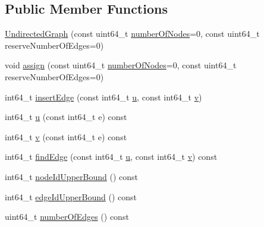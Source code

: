 \subsection*{Public Member Functions}
\begin{DoxyCompactItemize}
\item 
\hyperlink{classnifty_1_1graph_1_1UndirectedGraph_a3c2087810feadcef80e0a1a1ca288b43}{Undirected\+Graph} (const uint64\+\_\+t \hyperlink{classnifty_1_1graph_1_1UndirectedGraph_af3450885d48968733f3754544a20c012}{number\+Of\+Nodes}=0, const uint64\+\_\+t reserve\+Number\+Of\+Edges=0)
\item 
void \hyperlink{classnifty_1_1graph_1_1UndirectedGraph_a0c4b2840735519b961431c64400c2dc2}{assign} (const uint64\+\_\+t \hyperlink{classnifty_1_1graph_1_1UndirectedGraph_af3450885d48968733f3754544a20c012}{number\+Of\+Nodes}=0, const uint64\+\_\+t reserve\+Number\+Of\+Edges=0)
\item 
int64\+\_\+t \hyperlink{classnifty_1_1graph_1_1UndirectedGraph_a72feacfbdf4fcf8025182cadd1ac62ea}{insert\+Edge} (const int64\+\_\+t \hyperlink{classnifty_1_1graph_1_1UndirectedGraph_ad615dcee7447b5663be51ff5725943d6}{u}, const int64\+\_\+t \hyperlink{classnifty_1_1graph_1_1UndirectedGraph_af5f8ff3cf680e86d0fc2eb4a40cd7e45}{v})
\item 
int64\+\_\+t \hyperlink{classnifty_1_1graph_1_1UndirectedGraph_ad615dcee7447b5663be51ff5725943d6}{u} (const int64\+\_\+t e) const
\item 
int64\+\_\+t \hyperlink{classnifty_1_1graph_1_1UndirectedGraph_af5f8ff3cf680e86d0fc2eb4a40cd7e45}{v} (const int64\+\_\+t e) const
\item 
int64\+\_\+t \hyperlink{classnifty_1_1graph_1_1UndirectedGraph_aa7b79785e3030d9a629987e3c5854d11}{find\+Edge} (const int64\+\_\+t \hyperlink{classnifty_1_1graph_1_1UndirectedGraph_ad615dcee7447b5663be51ff5725943d6}{u}, const int64\+\_\+t \hyperlink{classnifty_1_1graph_1_1UndirectedGraph_af5f8ff3cf680e86d0fc2eb4a40cd7e45}{v}) const
\item 
int64\+\_\+t \hyperlink{classnifty_1_1graph_1_1UndirectedGraph_adab2b7ff99de38d68bccb75d928252ac}{node\+Id\+Upper\+Bound} () const
\item 
int64\+\_\+t \hyperlink{classnifty_1_1graph_1_1UndirectedGraph_a7f8d1e94b073910e57f53e57905f7877}{edge\+Id\+Upper\+Bound} () const
\item 
uint64\+\_\+t \hyperlink{classnifty_1_1graph_1_1UndirectedGraph_ac11798f3ea9a39d2af683c6a6af5c30d}{number\+Of\+Edges} () const
\item 

\end{DoxyCompactItemize}

